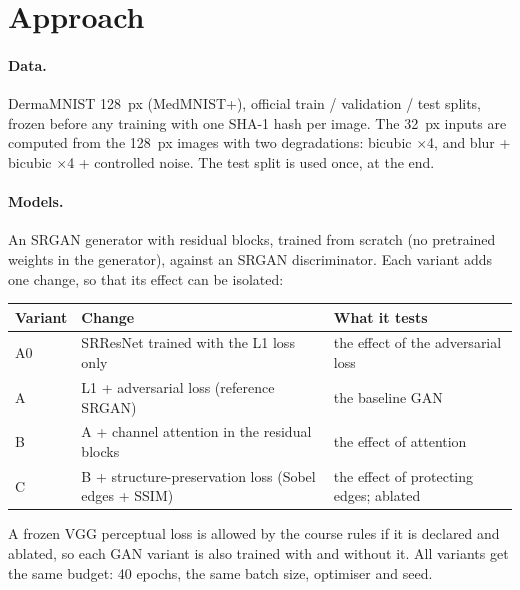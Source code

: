 \documentclass[11pt,a4paper]{article}
\begin{document}
\section{Approach}

\paragraph{Data.} DermaMNIST 128~px (MedMNIST+), official train / validation / test splits, frozen
before any training with one SHA-1 hash per image. The 32~px inputs are computed from the 128~px
images with two degradations: bicubic $\times$4, and blur + bicubic $\times$4 + controlled noise.
The test split is used once, at the end.

\paragraph{Models.} An SRGAN generator with residual blocks, trained from scratch (no pretrained
weights in the generator), against an SRGAN discriminator. Each variant adds one change, so that its
effect can be isolated:

\begin{table}[H]
\centering\small
\begin{tabularx}{\textwidth}{@{}p{1.2cm}L L@{}}
\toprule
Variant & Change & What it tests \\
\midrule
A0 & SRResNet trained with the L1 loss only & the effect of the adversarial loss \\
A & L1 + adversarial loss (reference SRGAN) & the baseline GAN \\
B & A + channel attention in the residual blocks & the effect of attention \\
C & B + structure-preservation loss (Sobel edges + SSIM) & the effect of protecting edges; ablated \\
\bottomrule
\end{tabularx}
\end{table}

A frozen VGG perceptual loss is allowed by the course rules if it is declared and ablated, so each
GAN variant is also trained with and without it. All variants get the same budget: 40 epochs, the
same batch size, optimiser and seed.
\end{document}
